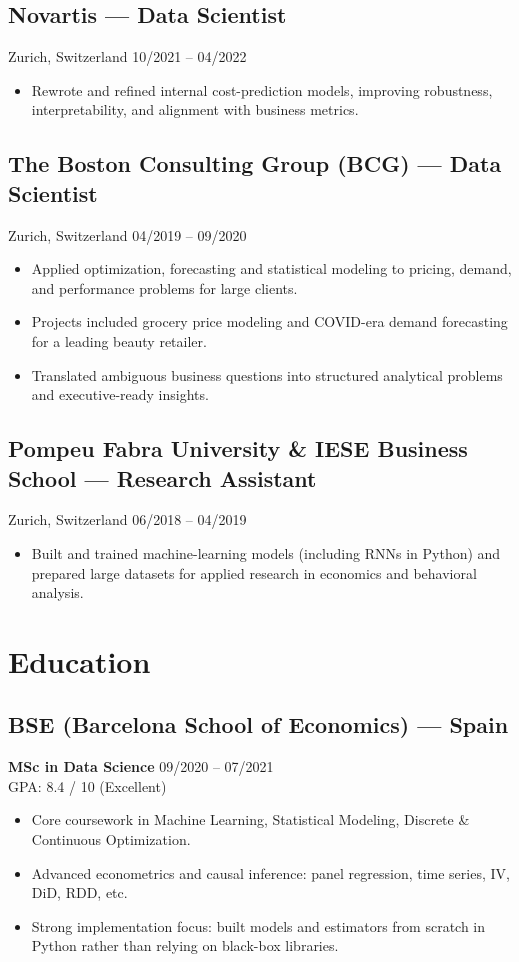 \documentclass[10.5pt,a4paper]{article}
\begin{document}
\subsection*{Novartis --- Data Scientist}
Zurich, Switzerland \hfill 10/2021 -- 04/2022
\begin{itemize}
    \item Rewrote and refined internal cost-prediction models, improving robustness, interpretability, and alignment with business metrics.
\end{itemize}

\subsection*{The Boston Consulting Group (BCG) --- Data Scientist}
Zurich, Switzerland \hfill 04/2019 -- 09/2020
\begin{itemize}
    \item Applied optimization, forecasting and statistical modeling to pricing, demand, and performance problems for large clients.
    \item Projects included grocery price modeling and COVID-era demand forecasting for a leading beauty retailer.
    \item Translated ambiguous business questions into structured analytical problems and executive-ready insights.
\end{itemize}

\subsection*{Pompeu Fabra University \& IESE Business School --- Research Assistant}
Zurich, Switzerland \hfill 06/2018 -- 04/2019
\begin{itemize}
    \item Built and trained machine-learning models (including RNNs in Python) and prepared large datasets for applied research in economics and behavioral analysis.
\end{itemize}

\section*{Education}

\subsection*{BSE (Barcelona School of Economics) --- Spain}
\textbf{MSc in Data Science} \hfill 09/2020 -- 07/2021 \\
GPA: 8.4 / 10 (Excellent)
\begin{itemize}
    \item Core coursework in Machine Learning, Statistical Modeling, Discrete \& Continuous Optimization.
    \item Advanced econometrics and causal inference: panel regression, time series, IV, DiD, RDD, etc.
    \item Strong implementation focus: built models and estimators from scratch in Python rather than relying on black-box libraries.
\end{itemize}
\end{document}
